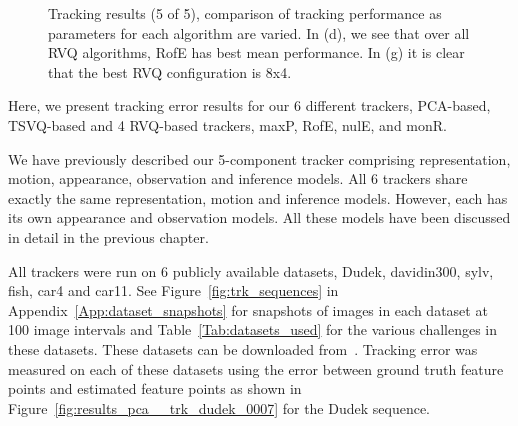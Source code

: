 \begin{Body}
\begin{figure}[h!]
								\caption{Tracking results (5 of 5), comparison of tracking performance as parameters for each algorithm are varied.  In (d), we see that over all RVQ algorithms, RofE has best mean performance.  In (g) it is clear that the best RVQ configuration is 8x4.}
								\label{fig:results_final_5_configs}
								\end{figure}


Here, we present tracking error results for our 6 different trackers, PCA-based, TSVQ-based and 4 RVQ-based trackers, maxP, RofE, nulE, and monR.

We have previously described our 5-component tracker comprising representation, motion, appearance, observation and inference models.  All 6 trackers share exactly the same representation, motion and inference models.  However, each has its own appearance and observation models.  All these models have been discussed in detail in the previous chapter.

All trackers were run on 6 publicly available datasets, Dudek, davidin300, sylv, fish, car4 and car11.  See Figure~\ref{fig:trk_sequences} in Appendix~\ref{App:dataset_snapshots} for snapshots of images in each dataset at 100 image intervals and Table~\ref{Tab:datasets_used} for the various challenges in these datasets.  These datasets can be downloaded from~\cite{2008_JNL_subspaceTRK_Ross}.  Tracking error was measured on each of these datasets using the error between ground truth feature points and estimated feature points as shown in Figure~\ref{fig:results_pca__trk_dudek_0007} for the Dudek sequence.



\end{Body}
